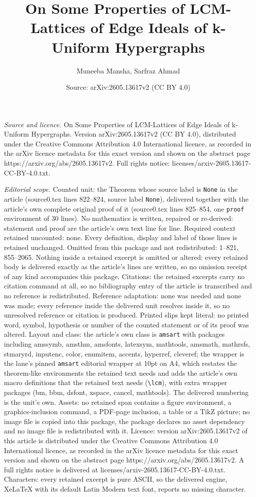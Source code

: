 \documentclass[10pt,a4paper]{amsart}
\title[On Some Properties of LCM-Lattices of Edge Ideals of k-Unifo]{On Some Properties of LCM-Lattices of Edge Ideals of k-Uniform Hypergraphs}
\author{Muneeba Mansha, Sarfraz Ahmad}
\date{Source: arXiv:2605.13617v2 (CC BY 4.0)}
\begin{document}
\maketitle

\noindent\emph{Source and licence.} On Some Properties of LCM-Lattices of Edge Ideals of k-Uniform Hypergraphs. Version arXiv:2605.13617v2 (CC BY 4.0), distributed under the Creative Commons Attribution 4.0 International licence, as recorded in the arXiv licence metadata for this exact version and shown on the abstract page https://arxiv.org/abs/2605.13617v2. Full rights notice: licenses/arxiv-2605.13617-CC-BY-4.0.txt.\par\smallskip

\noindent\textit{Editorial scope.} Counted unit: the Theorem whose source label is \texttt{None} in the article (source0.tex lines 822--824, source label \texttt{None}), delivered together with the article's own complete original proof of it (source0.tex lines 825--854, one \texttt{proof} environment of 30 lines). No mathematics is written, repaired or re-derived: statement and proof are the article's own text line for line. Required context retained uncounted: none. Every definition, display and label of those lines is retained unchanged. Omitted from this package and not redistributed: 1--821, 855--2065. Nothing inside a retained excerpt is omitted or altered: every retained body is delivered exactly as the article's lines are written, so no omission receipt of any kind accompanies this package. Citations: the retained excerpts carry no citation command at all, so no bibliography entry of the article is transcribed and no reference is redistributed. Reference adaptation: none was needed and none was made; every reference inside the delivered unit resolves inside it, so no unresolved reference or citation is produced. Printed slips kept literal: no printed word, symbol, hypothesis or number of the counted statement or of its proof was altered. Layout and class: the article's own class is \texttt{amsart} with packages including amssymb, amsthm, amsfonts, latexsym, mathtools, amsmath, mathrsfs, stmaryrd, inputenc, color, enumitem, accents, hyperref, cleveref; the wrapper is the lane's pinned \texttt{amsart} editorial wrapper at 10pt on A4, which restates the theorem-like environments the retained text needs and adds the article's own macro definitions that the retained text needs (\texttt{\textbackslash lcm}), with extra wrapper packages (bm, bbm, dsfont, xspace, cancel, mathtools). The delivered numbering is the unit's own. Assets: no retained span contains a figure environment, a graphics-inclusion command, a PDF-page inclusion, a table or a TikZ picture; no image file is copied into this package, the package declares no asset dependency and no image file is redistributed with it. Licence: version arXiv:2605.13617v2 of this article is distributed under the Creative Commons Attribution 4.0 International licence, as recorded in the arXiv licence metadata for this exact version and shown on the abstract page https://arxiv.org/abs/2605.13617v2. A full rights notice is delivered at licenses/arxiv-2605.13617-CC-BY-4.0.txt. Characters: every retained excerpt is pure ASCII, so the delivered engine, XeLaTeX with its default Latin Modern text font, reports no missing character.
\end{document}
